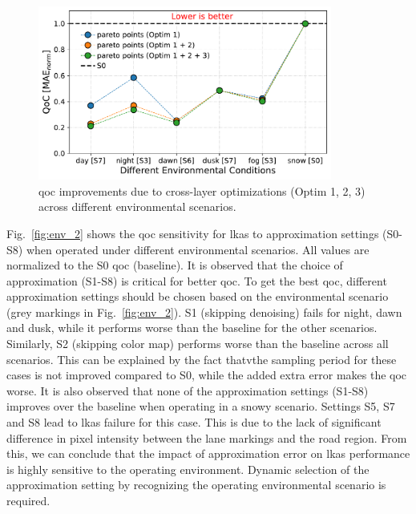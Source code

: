 \begin{figure}[ht]
    \centering
    \includegraphics[width= 0.86\textwidth]{figs/lqg2.pdf}
    \captionsetup{width=0.9\linewidth}
    \caption{{\Gls{qoc} improvements due to cross-layer optimizations (Optim 1, 2, 3) across different environmental scenarios.}}
    \label{fig:env_3}
    \vspace{-1em}
\end{figure}

\par Fig.~\ref{fig:env_2} shows the \gls{qoc} sensitivity for \gls{lkas} to approximation settings (S0-S8) when operated under different environmental scenarios. All values are normalized to the S0 \gls{qoc} (baseline). It is observed that the choice of approximation (S1-S8) is critical for better \gls{qoc}. To get the best \gls{qoc}, different approximation settings should be chosen based on the environmental scenario (grey markings in Fig.\ \ref{fig:env_2}). S1 (skipping denoising) fails for night, dawn and dusk, while it performs worse than the baseline for the other scenarios. Similarly, S2 (skipping color map) performs worse than the baseline across all scenarios. This can be explained by the fact thatvthe sampling period for these cases is not improved compared to S0, while the added extra error makes the \gls{qoc} worse. It is also observed that none of the approximation settings (S1-S8) improves over the baseline when operating in a snowy scenario. Settings S5, S7 and S8 lead to \gls{lkas} failure for this case. This is due to the lack of significant difference in pixel intensity between the lane markings and the road region. From this, we can conclude that the impact of approximation error on \gls{lkas} performance is highly sensitive to the operating environment. Dynamic selection of the approximation setting by recognizing the operating environmental scenario is required. 

